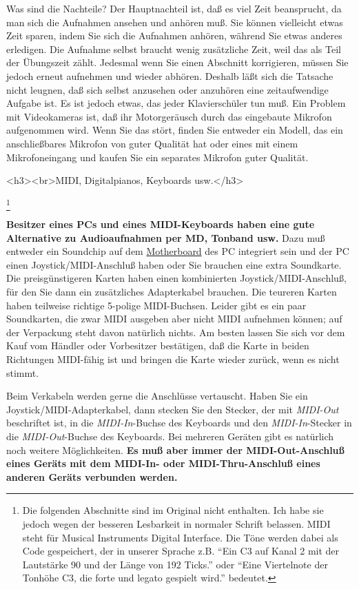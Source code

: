 Was sind die Nachteile?
Der Hauptnachteil ist, daß es viel Zeit beansprucht, da man sich die Aufnahmen ansehen und anhören muß.
Sie können vielleicht etwas Zeit sparen, indem Sie sich die Aufnahmen anhören, während Sie etwas anderes erledigen.
Die Aufnahme selbst braucht wenig zusätzliche Zeit, weil das als Teil der Übungszeit zählt.
Jedesmal wenn Sie einen Abschnitt korrigieren, müssen Sie jedoch erneut aufnehmen und wieder abhören.
Deshalb läßt sich die Tatsache nicht leugnen, daß sich selbst anzusehen oder anzuhören eine zeitaufwendige Aufgabe ist.
Es ist jedoch etwas, das jeder Klavierschüler tun muß.
Ein Problem mit Videokameras ist, daß ihr Motorgeräusch durch das eingebaute Mikrofon aufgenommen wird.
Wenn Sie das stört, finden Sie entweder ein Modell, das ein anschließbares Mikrofon von guter Qualität hat oder eines mit einem  Mikrofoneingang und kaufen Sie ein separates Mikrofon guter Qualität.


\label{c1iii13MIDI}

<h3><br>MIDI, Digitalpianos, Keyboards usw.</h3>

\footnote{Die folgenden Abschnitte sind im Original nicht enthalten.
Ich habe sie jedoch wegen der besseren Lesbarkeit in normaler Schrift belassen.
MIDI steht für Musical Instruments Digital Interface. Die Töne werden dabei als Code gespeichert, der in unserer Sprache z.B. \enquote{Ein C3 auf Kanal 2 mit der Lautstärke 90 und der Länge von 192 Ticks.} oder \enquote{Eine Viertelnote der Tonhöhe C3, die forte und legato gespielt wird.} bedeutet.}


\textbf{Besitzer eines PCs und eines MIDI-Keyboards haben eine gute Alternative zu Audioaufnahmen per MD, Tonband usw.}
Dazu muß entweder ein Soundchip auf dem \hyperref[Motherboard]{Motherboard} des PC integriert sein und der PC einen Joystick/MIDI-Anschluß haben oder Sie brauchen eine extra Soundkarte.
Die preisgünstigeren Karten haben einen kombinierten Joystick/MIDI-Anschluß, für den Sie dann ein zusätzliches Adapterkabel brauchen.
Die teureren Karten haben teilweise richtige 5-polige MIDI-Buchsen.
Leider gibt es ein paar Soundkarten, die zwar MIDI ausgeben aber nicht MIDI aufnehmen können; auf der Verpackung steht davon natürlich nichts.
Am besten lassen Sie sich vor dem Kauf vom Händler oder Vorbesitzer bestätigen, daß die Karte in beiden Richtungen MIDI-fähig ist und bringen die Karte wieder zurück, wenn es nicht stimmt.

Beim Verkabeln werden gerne die Anschlüsse vertauscht.
Haben Sie ein Joystick/MIDI-Adapterkabel, dann stecken Sie den Stecker, der mit \textit{MIDI-Out} beschriftet ist, in die \textit{MIDI-In}-Buchse des Keyboards und den \textit{MIDI-In}-Stecker in die \textit{MIDI-Out}-Buchse des Keyboards.
Bei mehreren Geräten gibt es natürlich noch weitere Möglichkeiten.
\textbf{Es muß aber immer der MIDI-Out-Anschluß eines Geräts mit dem MIDI-In- oder MIDI-Thru-Anschluß eines anderen Geräts verbunden werden.}

